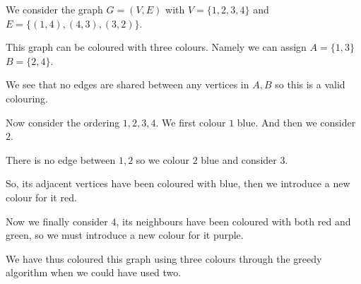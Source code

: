 \begin{soln}
	We consider the graph \(G = (V, E)\) with \(V = \{1, 2, 3, 4\}\) and \(E = \{(1, 4), (4, 3), (3, 2)\}\).

	This graph can be coloured with three colours. Namely we can assign \(A = \{1, 3\}\) \(B = \{2, 4\}\).

	We see that no edges are shared between any vertices in \(A, B\) so this is a valid colouring.

	Now consider the ordering \(1, 2, 3, 4\). We first colour \(1\) blue. And then we consider \(2\).

	There is no edge between \(1, 2\) so we colour \(2\) blue and consider \(3\).

	So, its adjacent vertices have been coloured with blue, then we introduce a new colour for it red.

	Now we finally consider \(4\), its neighbours have been coloured with both red and green, so we must introduce a new colour for it purple.

	We have thus coloured this graph using three colours through the greedy algorithm when we could have used two.


\end{soln}
